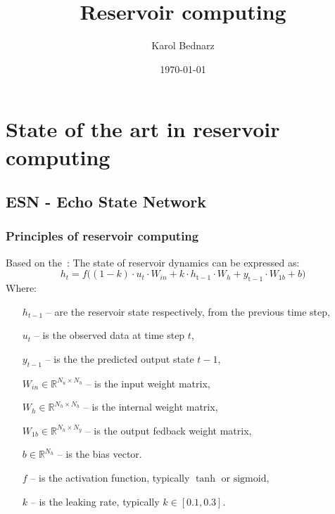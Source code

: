 \documentclass[11pt, oneside]{article}
\title{Reservoir computing}
\author{Karol Bednarz}
\date{\today}
\begin{document}
\maketitle
\tableofcontents

\vspace{.25in}

\newcommand{\Todo}[1]{\textcolor                {red}{\textbf{TODO:} #1}}


\section{State of the art in reservoir computing}

\subsection{ESN - Echo State Network}
\subsubsection{Principles of reservoir computing}
Based on the~\autocite{Bai2023}:
The state of reservoir dynamics can be expressed as:
\begin{equation}
    h_t = f \big((1-k) \cdot u_t \cdot W_{in} + k\cdot h_{\mathrm{t-1}} \cdot W_h + y_{\mathrm{t-1}} \cdot W_{1b} + b \big)
\end{equation}
Where:
\begin{itemize}[noitemsep, leftmargin=4cm, label={}]
    \item [\(h_{t-1}\)] -- are the reservoir state respectively, from the previous time step,
    \item [\(u_t\)] -- is the observed data at time step \(t\),
    \item [\(y_{t-1}\)] -- is the the predicted output state \(t-1\),
    \item [\(W_{in} \in \mathbb{R}^{N_u \times N_h}\)] -- is the input weight matrix,
    \item [\(W_h \in \mathbb{R}^{N_h \times N_h}\)] -- is the internal weight matrix,
    \item [\(W_{1b} \in \mathbb{R}^{N_h \times N_y}\)] -- is the output fedback weight matrix,
    \item [\(b \in \mathbb{R}^{N_h}\)] -- is the bias vector.
    \item [\(f\)] -- is the activation function, typically \(\tanh\) or \(\mathrm{sigmoid}\),
    \item [\(k\)] -- is the leaking rate, typically \(k \in [0.1, 0.3]\).
\end{itemize}
\end{document}
